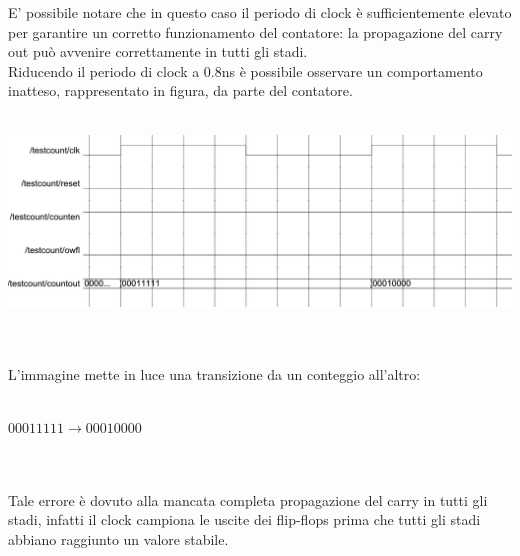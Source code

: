 \documentclass[10pt,  english, makeidx, a4paper, titlepage, oneside]{book}
\begin{document}
E' possibile notare che in questo caso il periodo di clock è 
sufficientemente elevato per garantire un corretto funzionamento 
del contatore: la propagazione del carry out può avvenire correttamente
in tutti gli stadi.
\\
Riducendo il periodo di clock a 0.8ns è possibile osservare un
comportamento inatteso, rappresentato in figura, da parte del contatore.
\\\\
\centerline{\includegraphics[width=15cm]{./img/Lab_1/Es_5/Clk_corto.png}}
\\\\
L'immagine mette in luce una transizione da un conteggio all'altro:
\\\\
\centerline{$00011111 \rightarrow 00010000$}
\\\\
Tale errore è dovuto alla mancata completa propagazione del carry in tutti
gli stadi, infatti il clock campiona le uscite dei flip-flops prima che tutti
gli stadi abbiano raggiunto un valore stabile. 

            
\end{document}
